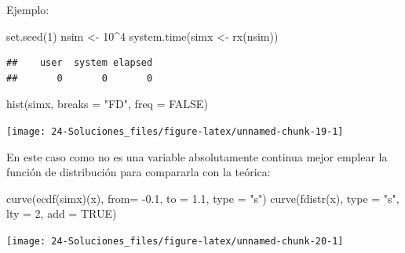 \documentclass[
]{book}
\newenvironment{Shaded}{\begin{snugshade}}{\end{snugshade}}
\newcommand{\AttributeTok}[1]{\textcolor[rgb]{0.77,0.63,0.00}{#1}}
\newcommand{\ConstantTok}[1]{\textcolor[rgb]{0.00,0.00,0.00}{#1}}
\newcommand{\DecValTok}[1]{\textcolor[rgb]{0.00,0.00,0.81}{#1}}
\newcommand{\FloatTok}[1]{\textcolor[rgb]{0.00,0.00,0.81}{#1}}
\newcommand{\FunctionTok}[1]{\textcolor[rgb]{0.00,0.00,0.00}{#1}}
\newcommand{\NormalTok}[1]{#1}
\newcommand{\OtherTok}[1]{\textcolor[rgb]{0.56,0.35,0.01}{#1}}
\newcommand{\SpecialCharTok}[1]{\textcolor[rgb]{0.00,0.00,0.00}{#1}}
\newcommand{\StringTok}[1]{\textcolor[rgb]{0.31,0.60,0.02}{#1}}
\theoremstyle{break}
\theoremstyle{nonumberplain}
\begin{document}
\begin{enumerate}
  Ejemplo:

\begin{Shaded}
\begin{Highlighting}[]
\FunctionTok{set.seed}\NormalTok{(}\DecValTok{1}\NormalTok{)}
\NormalTok{nsim }\OtherTok{\textless{}{-}} \DecValTok{10}\SpecialCharTok{\^{}}\DecValTok{4}
\FunctionTok{system.time}\NormalTok{(simx }\OtherTok{\textless{}{-}} \FunctionTok{rx}\NormalTok{(nsim))}
\end{Highlighting}
\end{Shaded}

\begin{verbatim}
##    user  system elapsed 
##       0       0       0
\end{verbatim}

\begin{Shaded}
\begin{Highlighting}[]
\FunctionTok{hist}\NormalTok{(simx, }\AttributeTok{breaks =} \StringTok{"FD"}\NormalTok{, }\AttributeTok{freq =} \ConstantTok{FALSE}\NormalTok{)}
\end{Highlighting}
\end{Shaded}

  \begin{center}\texttt{[image: 24-Soluciones\_files/figure-latex/unnamed-chunk-19-1]} \end{center}

  En este caso como no es una variable absolutamente continua mejor emplear
  la función de distribución para compararla con la teórica:

\begin{Shaded}
\begin{Highlighting}[]
\FunctionTok{curve}\NormalTok{(}\FunctionTok{ecdf}\NormalTok{(simx)(x), }\AttributeTok{from=} \SpecialCharTok{{-}}\FloatTok{0.1}\NormalTok{, }\AttributeTok{to =} \FloatTok{1.1}\NormalTok{, }\AttributeTok{type =} \StringTok{"s"}\NormalTok{)}
\FunctionTok{curve}\NormalTok{(}\FunctionTok{fdistr}\NormalTok{(x), }\AttributeTok{type =} \StringTok{"s"}\NormalTok{, }\AttributeTok{lty =} \DecValTok{2}\NormalTok{, }\AttributeTok{add =} \ConstantTok{TRUE}\NormalTok{)}
\end{Highlighting}
\end{Shaded}

  \begin{center}\texttt{[image: 24-Soluciones\_files/figure-latex/unnamed-chunk-20-1]} \end{center}
\end{enumerate}

  
\end{document}
